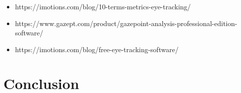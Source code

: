 \documentclass[12pt]{article}
\begin{document}





\begin{itemize}
  \item https://imotions.com/blog/10-terms-metrics-eye-tracking/
  \item https://www.gazept.com/product/gazepoint-analysis-professional-edition-software/
  \item https://imotions.com/blog/free-eye-tracking-software/
\end{itemize}


\section{Conclusion}


\pagebreak


\end{document}
